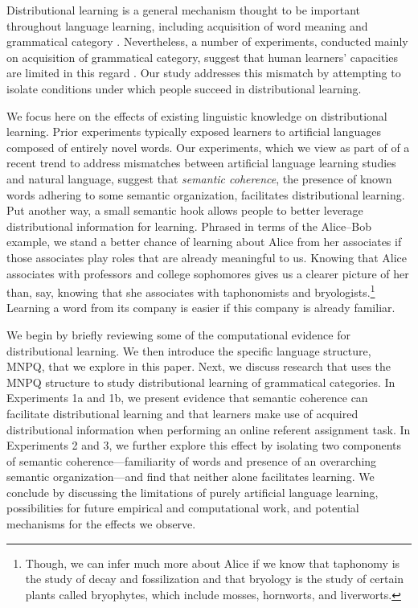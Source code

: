 \documentclass[man,longtable, floatmark]{my-apa6}
\begin{document}
Distributional learning is a general mechanism thought to be important throughout language learning, including acquisition of word meaning \citep{landauer1997} and grammatical category \citep{redington1998}. Nevertheless, a number of experiments, conducted mainly on acquisition of grammatical category, suggest that human learners' capacities are limited in this regard \citep{braine1987, brooks1993, frigo1998, kempe2001, gerken2005, frank2011}. Our study addresses this mismatch by attempting to isolate conditions under which people succeed in distributional learning.

We focus here on the effects of existing linguistic knowledge on distributional learning. Prior experiments typically exposed learners to artificial languages composed of entirely novel words. Our experiments, which we view as part of  of a recent trend to address mismatches between artificial language learning studies and natural language, suggest that \emph{semantic coherence}, the presence of known words adhering to some semantic organization, facilitates distributional learning. Put another way, a small semantic hook allows people to better leverage distributional information for learning. Phrased in terms of the Alice--Bob example, we stand a better chance of learning about Alice from her associates if those associates play roles that are already meaningful to us. Knowing that Alice associates with professors and college sophomores gives us a clearer picture of her than, say, knowing that she associates with taphonomists and bryologists.\footnote{Though, we can infer much more about Alice if we know that taphonomy is the study of decay and fossilization and that bryology is the study of certain plants called bryophytes, which include mosses, hornworts, and liverworts.} Learning a word from its company is easier if this company is already familiar.

We begin by briefly reviewing some of the computational evidence for distributional learning. We then introduce the specific language structure, MNPQ, that we explore in this paper. Next, we discuss research that uses the MNPQ structure to study distributional learning of grammatical categories. In Experiments 1a and 1b, we present evidence that semantic coherence can facilitate distributional learning and that learners make use of acquired distributional information when performing an online referent assignment task. In Experiments 2 and 3, we further explore this effect by isolating two components of semantic coherence---familiarity of words and presence of an overarching semantic organization---and find that neither alone facilitates learning. We conclude by discussing the limitations of purely artificial language learning, possibilities for future empirical and computational work, and potential mechanisms for the effects we observe.
\end{document}
